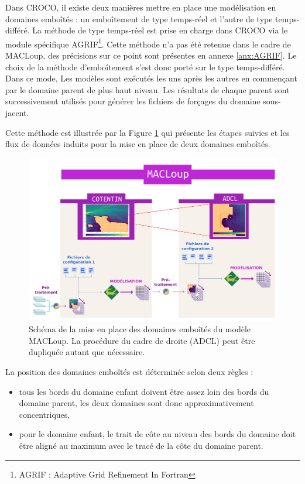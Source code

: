 \documentclass[10pt,a4paper,titlepage]{article}
\begin{document}
Dans CROCO, il existe deux manières mettre en place une modélisation en domaines emboîtés : un emboîtement de type temps-réel et l'autre de type temps-différé.
La méthode de type temps-réel est prise en charge dans CROCO via le module spécifique AGRIF\footnote{AGRIF : Adaptive Grid Refinement In Fortran}.
Cette méthode n'a pas été retenue dans le cadre de MACLoup, des précisions sur ce point sont présentes en annexe \ref{anx:AGRIF}.
Le choix de la méthode d'emboîtement s'est donc porté sur le type temps-différé.
Dans ce mode, Les modèles sont exécutés les uns après les autres en commençant par le domaine parent de plus haut niveau.
Les résultats de chaque parent sont successivement utilisés pour générer les fichiers de forçages du domaine sous-jacent.

Cette méthode est illustrée par la Figure \ref{fig:imbrication_workflow} qui présente les étapes suivies et les flux de données induits pour la mise en place de deux domaines emboîtés.

\begin{figure}[H]
    \centering
    \includegraphics[scale=0.3]{../images/workflow/multi_grid.pdf}
    \caption{Schéma de la mise en place des domaines emboîtés du modèle MACLoup. La procédure du cadre de droite (ADCL) peut être dupliquée autant que nécessaire.}
    \label{fig:imbrication_workflow}
\end{figure}


La position des domaines emboîtés est déterminée selon deux règles :
\begin{itemize}
	\item tous les bords du domaine enfant doivent être assez loin des bords du domaine parent, les deux domaines sont donc approximativement concentriques,
	\item pour le domaine enfant, le trait de côte au niveau des bords du domaine doit être aligné au maximum avec le tracé de la côte du domaine parent.
\end{itemize}
\end{document}
